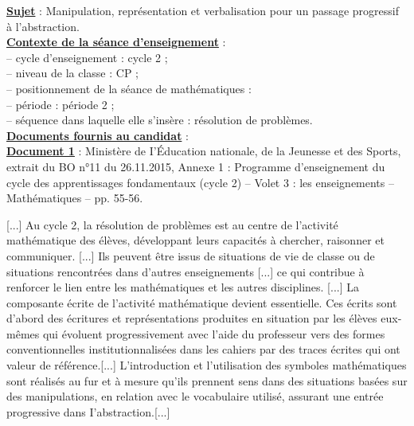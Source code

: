 {\bf\uline{Sujet}} : Manipulation, représentation et verbalisation pour un passage progressif à l'abstraction. \\

{\bf\uline{Contexte de la séance d'enseignement}} : \\
   \hspace*{5mm} -- cycle d'enseignement : cycle 2 ; \\
   \hspace*{5mm} -- niveau de la classe : CP ; \\
   \hspace*{5mm} -- positionnement de la séance de mathématiques : \\
      \hspace*{10mm} -- période : période 2 ; \\
      \hspace*{10mm} -- séquence dans laquelle elle s'insère : résolution de problèmes. \\ [10mm]

{\bf\uline{Documents fournis au candidat}} : \\

{\bf\uline{Document 1}} : Ministère de I'Éducation nationale, de la Jeunesse et des Sports, extrait du BO n°11 du 26.11.2015, Annexe 1 : Programme d'enseignement du cycle des apprentissages fondamentaux (cycle 2) -- Volet 3 : les enseignements -- Mathématiques -- pp. 55-56.

\begin{center}
   \begin{minipage}{15cm}
      \textsf{[...] Au cycle 2, la résolution de problèmes est au centre de l'activité mathématique des élèves, développant leurs capacités à chercher, raisonner et communiquer. [...] Ils peuvent être issus de situations de vie de classe ou de situations rencontrées dans d'autres enseignements [...] ce qui contribue à renforcer le lien entre les mathématiques et les autres disciplines. [...] La composante écrite de l'activité mathématique devient essentielle. Ces écrits sont d'abord des écritures et représentations produites en situation par les élèves eux-mêmes qui évoluent progressivement avec l'aide du professeur vers des formes conventionnelles institutionnalisées dans les cahiers par des traces écrites qui ont valeur de référence.[...] L'introduction et l'utilisation des symboles mathématiques sont réalisés au fur et à mesure qu'ils prennent sens dans des situations basées sur des manipulations, en relation avec le vocabulaire utilisé, assurant une entrée progressive dans I'abstraction.[...]}
  \end{minipage}
\end{center}


